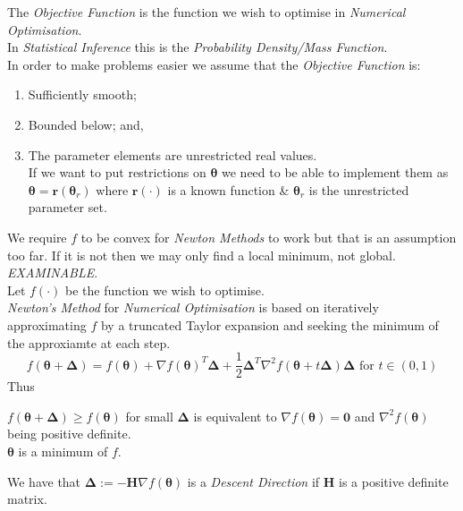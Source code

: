\documentclass[11pt,a4paper]{article}
\begin{document}
The \textit{Objective Function} is the function we wish to optimise in \textit{Numerical Optimisation}.\\
\nb In \textit{Statistical Inference} this is the \textit{Probability Density/Mass Function}.\\

In order to make problems easier we assume that the \textit{Objective Function} is:
\begin{enumerate}
	\item Sufficiently smooth;
	\item Bounded below; and,
	\item The parameter elements are unrestricted real values.\\
	If we want to put restrictions on $\pmb\theta$ we need to be able to implement them as $\pmb\theta=\textbf{r}(\pmb\theta_r)$ where $\textbf{r}(\cdot)$ is a known function \& $\pmb\theta_r$ is the unrestricted parameter set.
\end{enumerate}
\nb We require $f$ to be convex for \textit{Newton Methods} to work but that is an assumption too far. If it is not then we may only find a local minimum, not global.\\

\textit{EXAMINABLE}.\\
Let $f(\cdot)$ be the function we wish to optimise.\\
\textit{Newton's Method} for \textit{Numerical Optimisation} is based on iteratively approximating $f$ by a truncated Taylor expansion and seeking the minimum of the approxiamte at each step.
$$f(\pmb\theta+\pmb\Delta)=f(\pmb\theta)+\nabla f(\pmb\theta)^T\pmb\Delta+\frac12\pmb\Delta^T\nabla^2 f(\pmb\theta+t\pmb\Delta)\pmb\Delta\text{ for }t\in(0,1)$$
Thus
\begin{center}$f(\pmb\theta+\pmb\Delta)\geq f(\pmb\theta)$ for small $\pmb\Delta$ is equivalent to $\nabla f(\pmb\theta)=\pmb0$ and $\nabla^2 f(\pmb\theta)$ being positive definite.\\
\ie $\pmb\theta$ is a minimum of $f$.\end{center}
We have that $\pmb\Delta:=-\textbf{H}\nabla f(\pmb\theta)$ is a \textit{Descent Direction} if $\textbf{H}$ is a positive definite matrix.\\ %
\end{document}

